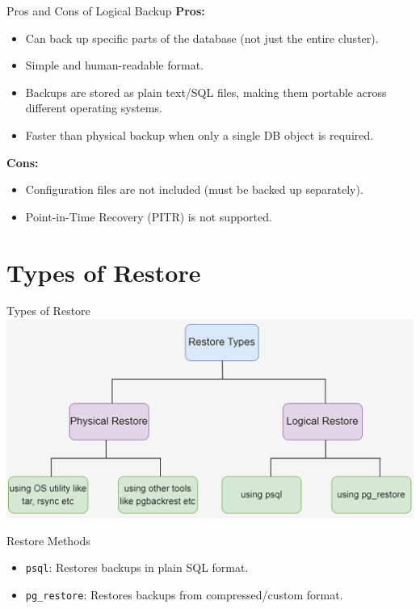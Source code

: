 \documentclass[aspectratio=169]{beamer}
\begin{document}
\begin{frame}{Pros and Cons of Logical Backup}
    \textbf{Pros:}
    \begin{itemize}
        \item Can back up specific parts of the database (not just the entire cluster).
        \item Simple and human-readable format.
        \item Backups are stored as plain text/SQL files, making them portable across different operating systems.
        \item Faster than physical backup when only a single DB object is required.
    \end{itemize}

    \vspace{0.3cm}
    \textbf{Cons:}
    \begin{itemize}
        \item Configuration files are not included (must be backed up separately).
        \item Point-in-Time Recovery (PITR) is not supported.
    \end{itemize}
\end{frame}

\section{Types of Restore}

\begin{frame}{Types of Restore}
    \centering
    \includegraphics[width=\textwidth]{figures/restore_types}
\end{frame}

\begin{frame}{Restore Methods}
    \begin{itemize}
        \item \texttt{psql}: Restores backups in plain SQL format.
        \item \texttt{pg\_restore}: Restores backups from compressed/custom format.
    \end{itemize}
\end{frame}
\end{document}
